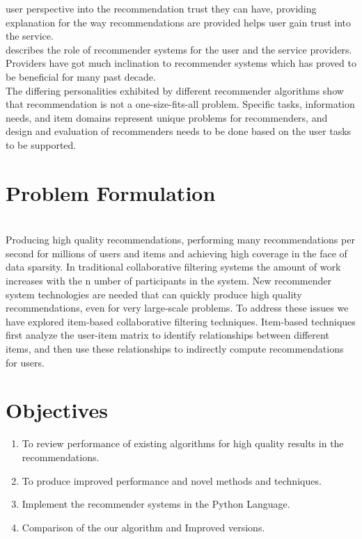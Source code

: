 \documentclass[12pt,a4paper]{article}
\begin{document}
	\cite{tintarev2011designing} user perspective into the recommendation trust they can have, providing explanation for the way recommendations are provided helps user gain trust into the service.\\
	
	\cite{ricci2011introduction} describes the role of recommender systems for the user and the service providers. Providers have got much inclination to recommender systems which has proved to be beneficial for many past decade.\\
	
	\cite{ekstrand2011collaborative} The differing personalities exhibited by different recommender algorithms show that recommendation is not a one-size-fits-all problem. Specific tasks, information needs, and item domains
	represent unique problems for recommenders, and design and evaluation of recommenders needs to be done based on the user tasks to be supported.\\
	
	\newpage
	\section{Problem Formulation}

	\textbf{}	\\Producing high quality recommendations, performing many recommendations per second for millions of users and items and achieving high coverage in the face of data sparsity. In traditional collaborative filtering systems the amount of work increases with the n umber of participants in the system. New recommender system technologies are needed that can quickly produce high quality recommendations, even for very large-scale problems. To address these issues we have explored item-based collaborative filtering techniques. Item-based techniques first analyze the user-item matrix to identify relationships between different items, and then use these relationships to indirectly compute recommendations for users. 

	\section{Objectives}
	\begin{enumerate}
		\item{To review performance of existing algorithms for high quality results in the recommendations.}
		\item{To produce improved performance and novel methods and techniques.}
		\item{Implement the recommender systems in the Python Language.}
		\item{Comparison of the our algorithm and Improved versions.}
	\end{enumerate}
	\textbf{}\\



	
	 
	
	\newpage
	
	
	
\end{document}
